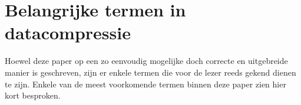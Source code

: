 \chapter{Belangrijke termen in datacompressie}
\label{ch:termen}

Hoewel deze paper op een zo eenvoudig mogelijke doch correcte en uitgebreide manier is geschreven, zijn er enkele termen die voor de lezer reeds gekend dienen te zijn. Enkele van de meest voorkomende termen binnen deze paper zien hier kort besproken.

\glsaddall
\printglossary[title=Woordenlijst]
